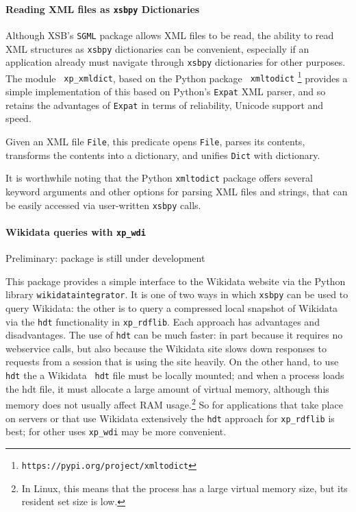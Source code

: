 
\paragraph{Reading XML files as {\tt xsbpy} Dictionaries}
%
Although XSB's {\tt SGML} package allows XML files to be read, the
ability to read XML structures as {\tt xsbpy} dictionaries can be
convenient, especially if an application already must navigate through
{\tt xsbpy} dictionaries for other purposes.  The module {\tt
  xp\_xmldict}, based on the Python package {\tt
  xmltodict} \footnote{{\tt https://pypi.org/project/xmltodict}}
provides a simple implementation of this based on Python's {\tt Expat}
XML parser, and so retains the advantages of {\tt Expat} in terms of
reliability, Unicode support and speed.

\begin{description}
  
  Given an XML file {\tt File}, this predicate opens {\tt File},
  parses its contents, transforms the contents into a dictionary, and
  unifies {\tt Dict} with dictionary.  
\end{description}

\noindent
It is worthwhile noting that the Python {\tt xmltodict} package offers
several keyword arguments and other options for parsing XML files and
strings, that can be easily accessed via user-written {\tt xsbpy}
calls.

\paragraph{Wikidata queries with {\tt xp\_wdi}}

{\sc Preliminary: package is still under development}

This package provides a simple interface to the Wikidata website via
the Python library {\tt wikidataintegrator}.  It is one of two ways in
which {\tt xsbpy} can be used to query Wikidata: the other is to query
a compressed local snapshot of Wikidata via the {\tt hdt}
functionality in {\tt xp\_rdflib}.  Each approach has advantages and
disadvantages.  The use of {\tt hdt} can be much faster: in part
because it requires no webservice calls, but also because the Wikidata
site slows down responses to requests from a session that is using the
site heavily.  On the other hand, to use {\tt hdt} the a Wikidata {\tt
  hdt} file must be locally mounted; and when a process loads the hdt
file, it must allocate a large amount of virtual memory, although this
memory does not usually affect RAM usage.\footnote{In Linux, this
  means that the process has a large virtual memory size, but its
  resident set size is low.}  So for applications that take place on
servers or that use Wikidata extensively the {\tt hdt} approach for
{\tt xp\_rdflib} is best; for other uses {\tt xp\_wdi} may be more
convenient.

